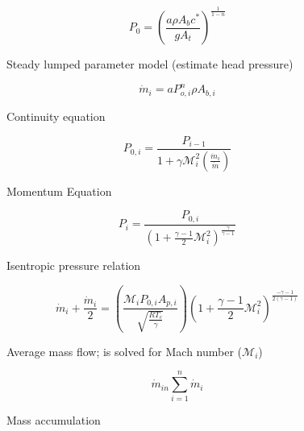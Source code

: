 \begin{figure}[htbp]
    \begin{equation} \label{equation:1}
        P_0 = \left(\frac{a \rho A_b c^*}{g A_t}\right)^\frac{1}{1-n}
    \end{equation}
    \caption*{Steady lumped parameter model (estimate head pressure)}
\end{figure}

\begin{figure}[htbp]
    \begin{equation} \label{equation:2}
        \dot{m}_i = a P_{o,i}^n \rho A_{b,i}
    \end{equation}
    \caption*{Continuity equation}
\end{figure}

\begin{figure}[htbp]
    \begin{equation} \label{equation:3}
        P_{0,i} = \frac{P_{i-1}}{1 + \gamma \mathcal{M}_i^2 \left(\frac{\dot{m}_i}{\dot{m}}\right)}
    \end{equation}
    \caption*{Momentum Equation}
\end{figure}

\begin{figure}[htbp]
    \begin{equation} \label{equation:4}
        P_i = \frac{P_{0,i}}{\left(1 + \frac{\gamma - 1}{2} \mathcal{M}_i^2\right)^\frac{\gamma}{\gamma - 1}}
    \end{equation}
    \caption*{Isentropic pressure relation}
\end{figure}

\begin{figure}[htbp]
    \begin{equation} \label{equation:5}
        \dot{m}_i + \frac{\dot{m}_i}{2} = \left(\frac{\mathcal{M}_i P_{0,i} A_{p,i}}{\sqrt{\frac{R T_c}{\gamma}}}\right) \left(1 + \frac{\gamma - 1}{2} \mathcal{M}_i^2\right)^\frac{-\gamma-1}{2(\gamma - 1)}
    \end{equation}
    \caption*{Average mass flow; is solved for Mach number (\(\mathcal{M}_i\))}
\end{figure}

\begin{figure}[htbp]
    \begin{equation} \label{equation:6}
        \dot{m}_{in} \sum_{i=1}^n \dot{m}_i
    \end{equation}
    \caption*{Mass accumulation}
\end{figure}

